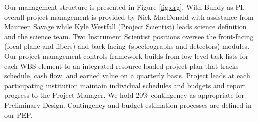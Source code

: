\documentclass[oneside,11pt]{amsart}
\begin{document}
Our management structure is presented in Figure \ref{fig:org}.  With Bundy as PI, overall project management is
provided by Nick MacDonald with assistance from Maureen Savage while Kyle Westfall (Project Scientist) leads science
definition and the science team.  Two Instrument Scientist positions oversee the front-facing (focal plane and fibers)
and back-facing (spectrographs and detectors) modules.  Our project management controls framework builds from low-level
task lists for each WBS element to an integrated resource-loaded project plan that tracks schedule, cash flow, and
earned value on a quarterly basis.  Project leads at each participating institution maintain individual schedules and
budgets and report progress to the Project Manager.  We hold 20\% contingency as appropriate for Preliminary Design.
Contingency and budget estimation processes are defined in our PEP.





\newpage

\setcounter{page}{1}


\end{document}

